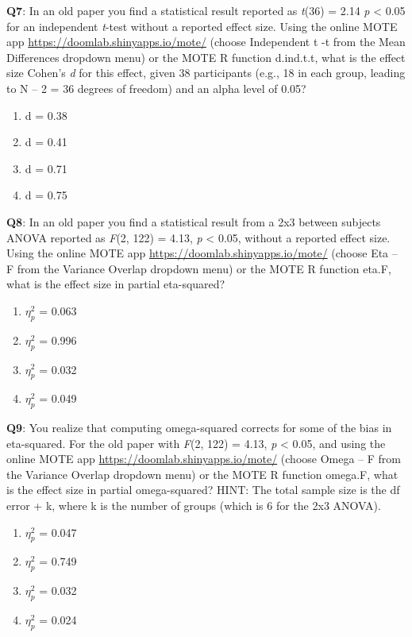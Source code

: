 \documentclass[
]{krantz}
\providecommand{\tightlist}{%
  \setlength{\itemsep}{0pt}\setlength{\parskip}{0pt}}
\begin{document}
\textbf{Q7}: In an old paper you find a statistical result reported as \emph{t}(36) = 2.14 \emph{p} \textless{} 0.05 for an independent \emph{t}-test without a reported effect size. Using the online MOTE app \url{https://doomlab.shinyapps.io/mote/} (choose Independent t -t from the Mean Differences dropdown menu) or the MOTE R function d.ind.t.t, what is the effect size Cohen's \emph{d} for this effect, given 38 participants (e.g., 18 in each group, leading to N -- 2 = 36 degrees of freedom) and an alpha level of 0.05?

\begin{enumerate}
\def\labelenumi{\Alph{enumi})}
\tightlist
\item
  d = 0.38
\item
  d = 0.41
\item
  d = 0.71
\item
  d = 0.75
\end{enumerate}

\textbf{Q8}: In an old paper you find a statistical result from a 2x3 between subjects ANOVA reported as \emph{F}(2, 122) = 4.13, \emph{p} \textless{} 0.05, without a reported effect size. Using the online MOTE app \url{https://doomlab.shinyapps.io/mote/} (choose Eta -- F from the Variance Overlap dropdown menu) or the MOTE R function eta.F, what is the effect size in partial eta-squared?

\begin{enumerate}
\def\labelenumi{\Alph{enumi})}
\tightlist
\item
  \(\eta_p^2\) = 0.063
\item
  \(\eta_p^2\) = 0.996
\item
  \(\eta_p^2\) = 0.032
\item
  \(\eta_p^2\) = 0.049
\end{enumerate}

\textbf{Q9}: You realize that computing omega-squared corrects for some of the bias in eta-squared. For the old paper with \emph{F}(2, 122) = 4.13, \emph{p} \textless{} 0.05, and using the online MOTE app \url{https://doomlab.shinyapps.io/mote/} (choose Omega -- F from the Variance Overlap dropdown menu) or the MOTE R function omega.F, what is the effect size in partial omega-squared? HINT: The total sample size is the df error + k, where k is the number of groups (which is 6 for the 2x3 ANOVA).

\begin{enumerate}
\def\labelenumi{\Alph{enumi})}
\tightlist
\item
  \(\eta_p^2\) = 0.047
\item
  \(\eta_p^2\) = 0.749
\item
  \(\eta_p^2\) = 0.032
\item
  \(\eta_p^2\) = 0.024
\end{enumerate}
\end{document}
